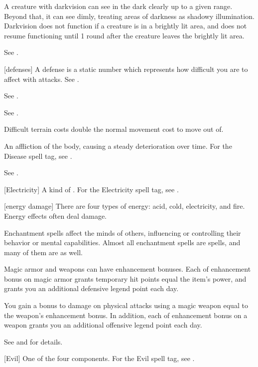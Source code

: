  A creature with darkvision can see in the dark clearly up to a given range.
Beyond that, it can see dimly, treating areas of darkness as shadowy illumination.
Darkvision does not function if a creature is in a brightly lit area, and does not resume functioning until 1 round after the creature leaves the brightly lit area.

 See .

[defenses] A defense is a static number which represents how difficult you are to affect with attacks. See .

 See .

 See .

 Difficult terrain costs double the normal movement cost to move out of.

 An affliction of the body, causing a steady deterioration over time. For the Disease spell tag, see .

 See .

[Electricity] A kind of . For the Electricity spell tag, see .

[energy damage] There are four types of energy: acid, cold, electricity, and fire. Energy effects often deal damage.

 Enchantment spells affect the minds of others, influencing or controlling their behavior or mental capabilities. Almost all enchantment spells are  spells, and many of them are  as well.

 Magic armor and weapons can have enhancement bonuses.
Each  of enhancement bonus on magic armor grants temporary hit points equal the item's power, and grants you an additional defensive legend point each day.

You gain a bonus to damage on physical attacks using a magic weapon equal to the weapon's enhancement bonus.
In addition, each  of enhancement bonus on a weapon grants you an additional offensive legend point each day.

See  and  for details.

[Evil] One of the four  components. For the Evil spell tag, see .

